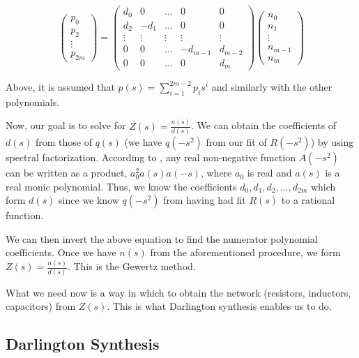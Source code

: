 \[ 
    \begin{pmatrix} p_0 \\ p_2 \\ \vdots \\ p_{2m} \end{pmatrix} = 
        \begin{pmatrix}
            d_0 & 0    & \ldots & 0 & 0      \\
            d_2 & -d_1 & \ldots & 0 & 0      \\
            \vdots & \vdots & \vdots & \vdots & \vdots \\
            0   &   0  & \ldots & -d_{m-1} & d_{m-2} \\
            0   &   0  & \ldots & 0 & d_{m} 
        \end{pmatrix}
        \begin{pmatrix}
            n_0 \\ n_1 \\ \vdots \\ n_{m-1} \\ n_{m}
        \end{pmatrix}
\]

Above, it is assumed that $p(s) = \sum^{2m-2}_{i=1} p_i s^i$ and similarly with
the other polynomials.

Now, our goal is to solve for $Z(s) = \frac{n(s)}{d(s)}$. We can obtain the
coefficients of $d(s)$ from those of $q(s)$ (we have $q(-s^2)$ from our fit of
$R(-s^2)$) by using spectral factorization. According to \cite{wcd}, any
real non-negative function $A(-s^2)$ can be written as a product, $a_0^2
a(s)a(-s)$, where $a_0$ is real and $a(s)$ is a real monic polynomial. Thus, we
know the coefficients $d_0, d_1, d_2,\ldots, d_{2m}$ which form $d(s)$ since we
know $q(-s^2)$ from having had fit $R(s)$ to a rational function.

We can then invert the above equation to find the numerator polynomial
coefficients. Once we have $n(s)$ from the aforementioned procedure, we form
$Z(s) = \frac{n(s)}{d(s)}$. This is the Gewertz method.

What we need now is a way in which to obtain the network (resistors, inductors,
capacitors) from $Z(s)$. This is what Darlington synthesis enables us to do.

\subsection*{Darlington Synthesis}

